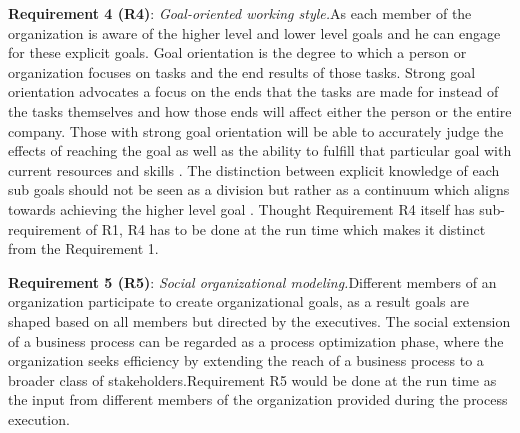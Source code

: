 \hspace{4ex} \textbf{Requirement 4 (R4)}: \textit{Goal-oriented working style.}As each member of the organization is aware of the higher level and lower level goals and he can engage for these explicit goals. Goal orientation is the degree to which a person or organization focuses on tasks and the end results of those tasks. Strong goal orientation advocates a focus on the ends that the tasks are made for instead of the tasks themselves and how those ends will affect either the person or the entire company. Those with strong goal orientation will be able to accurately judge the effects of reaching the goal as well as the ability to fulfill that particular goal with current resources and skills \cite{Lacom}. The distinction between explicit knowledge of each sub goals should not be seen as a division but rather as a continuum which aligns towards achieving the higher level goal . Thought Requirement R4 itself has sub-requirement of R1, R4 has to be done at the run time which makes it distinct from the Requirement 1.

\hspace{4ex} \textbf{Requirement 5 (R5)}: \textit{Social organizational modeling.}Different members of an organization participate to create organizational goals, as a result goals are shaped based on all members but directed by the executives. The  social  extension  of  a  business  process  can  be  regarded  as  a  process optimization phase, where the organization seeks efficiency  by  extending  the  reach  of  a  business  process  to  a  broader  class  of  stakeholders\cite{Brambilla2012}.Requirement R5 would be done at the run time as the input from different members of the organization provided during the process execution.


